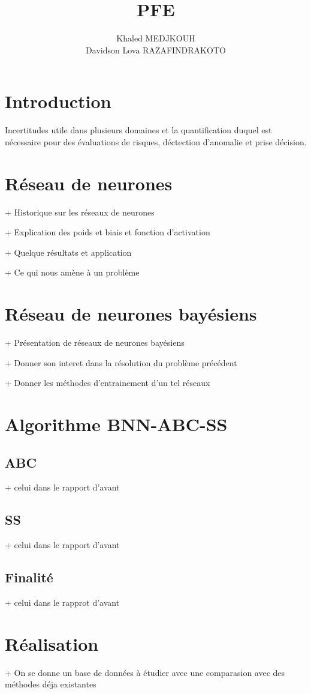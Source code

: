 \documentclass{article}
\title{PFE}
\author{Khaled MEDJKOUH \\ Davidson Lova RAZAFINDRAKOTO}
\begin{document}
\maketitle

\pagebreak

\tableofcontents

\pagebreak

\section{Introduction}
Incertitudes utile dans plusieurs domaines et la quantification duquel
est nécessaire pour des évaluations de risques, déctection d'anomalie et prise décision.


\pagebreak

\section{Réseau de neurones}

+ Historique sur les réseaux de neurones

+ Explication des poids et biais et fonction d'activation

+ Quelque résultats et application

+ Ce qui nous amène à un problème


\pagebreak

\section{Réseau de neurones bayésiens}

+ Présentation de réseaux de neurones bayésiens

+ Donner son interet dans la résolution du problème précédent

+ Donner les méthodes d'entrainement d'un tel réseaux

\pagebreak

\section{Algorithme BNN-ABC-SS}

\subsection{ABC}

+ celui dans le rapport d'avant

\subsection{SS}

+ celui dans le rapport d'avant

\subsection{Finalité}

+ celui dans le rapprot d'avant

\pagebreak

\section{Réalisation}

+ On se donne un base de données à étudier
avec une comparasion avec des méthodes déja existantes
\end{document}
